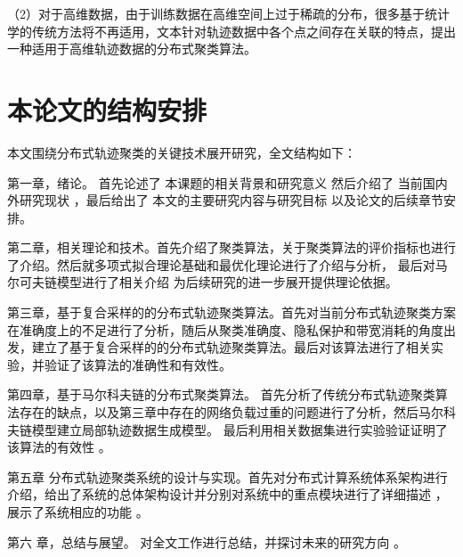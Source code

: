 （2）对于高维数据，由于训练数据在高维空间上过于稀疏的分布，很多基于统计学的传统方法将不再适用，文本针对轨迹数据中各个点之间存在关联的特点，提出一种适用于高维轨迹数据的分布式聚类算法。


\section{本论文的结构安排}
本文围绕分布式轨迹聚类的关键技术展开研究，全文结构如下：

第一章，绪论。 首先论述了 本课题的相关背景和研究意义 然后介绍了 当前国内外研究现状 ，最后给出了 本文的主要研究内容与研究目标 以及论文的后续章节安排。

第二章，相关理论和技术。首先介绍了聚类算法，关于聚类算法的评价指标也进行了介绍。然后就多项式拟合理论基础和最优化理论进行了介绍与分析， 最后对马尔可夫链模型进行了相关介绍 为后续研究的进一步展开提供理论依据。

第三章，基于复合采样的的分布式轨迹聚类算法。首先对当前分布式轨迹聚类方案在准确度上的不足进行了分析，随后从聚类准确度、隐私保护和带宽消耗的角度出发，建立了基于复合采样的的分布式轨迹聚类算法。最后对该算法进行了相关实验，并验证了该算法的准确性和有效性。

第四章，基于马尔科夫链的分布式聚类算法。 首先分析了传统分布式轨迹聚类算法存在的缺点，以及第三章中存在的网络负载过重的问题进行了分析，然后马尔科夫链模型建立局部轨迹数据生成模型。 最后利用相关数据集进行实验验证证明了该算法的有效性 。

第五章 分布式轨迹聚类系统的设计与实现。首先对分布式计算系统体系架构进行介绍，给出了系统的总体架构设计并分别对系统中的重点模块进行了详细描述 ，展示了系统相应的功能 。

第六 章，总结与展望。 对全文工作进行总结，并探讨未来的研究方向 。
